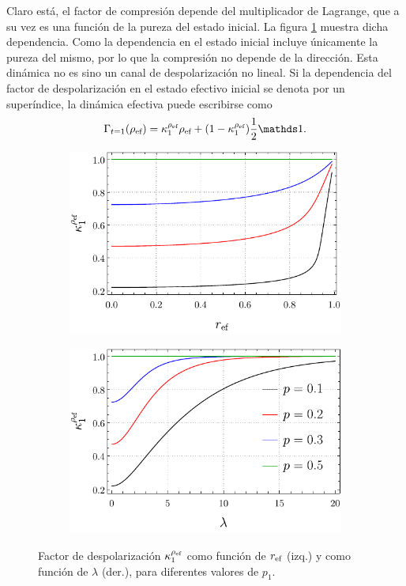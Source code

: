 Claro está, el factor de compresión depende del multiplicador de Lagrange, que a su vez es una función de la pureza del estado inicial. La figura \ref{fig:SWAPFactor2Drl} muestra dicha dependencia. Como la dependencia en el estado inicial incluye únicamente la pureza del mismo, por lo que la compresión no depende de la dirección. Esta dinámica no es sino un canal de despolarización no lineal. Si la dependencia del factor de despolarización en el estado efectivo inicial se denota por un superíndice, la dinámica efectiva puede escribirse como
\begin{equation}\label{eq:EffectiveSWAP1}
  \Gamma_{t=1}(\rho_{\ef})=\kappa_{1}^{\rho_{\ef}}\rho_{\ef}+(1-\kappa_{1}^{\rho_{\ef}})\frac{1}{2}\Id.
\end{equation}
\begin{figure}[ht!]
  \centering
  \begin{subfigure}{0.5\textwidth}
    \centering
    \includegraphics[width=0.9\linewidth]{chapter4/figures_toy/K(r).pdf}
  \end{subfigure}%
  \begin{subfigure}{0.5\textwidth}
    \centering
    \includegraphics[width=0.9\linewidth]{chapter4/figures_toy/K(lambda).pdf}
  \end{subfigure}
  \caption{Factor de despolarización $\kappa_{1}^{\rho_{\text{ef}}}$ como función de $r_{\text{ef}}$ (izq.) y como función de $\lambda$ (der.), para diferentes valores de $p_{1}$.}\label{fig:SWAPFactor2Drl}
\end{figure}


